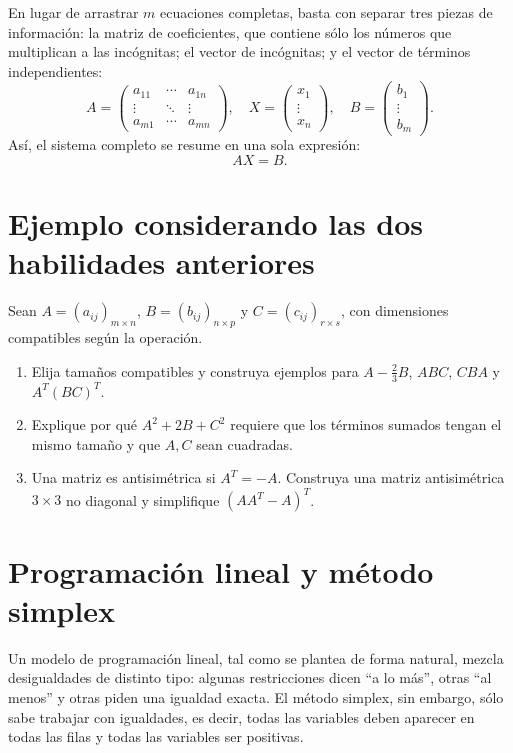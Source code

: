 \documentclass[12pt,a4paper]{article}
\begin{document}
En lugar de arrastrar \(m\) ecuaciones completas, basta con separar tres piezas de información: la matriz de coeficientes, que contiene sólo los números que multiplican a las incógnitas; el vector de incógnitas; y el vector de términos independientes:
\[
A=\begin{pmatrix}
a_{11}&\cdots&a_{1n}\\
\vdots&\ddots&\vdots\\
a_{m1}&\cdots&a_{mn}
\end{pmatrix},
\quad
X=\begin{pmatrix}x_1\\ \vdots\\x_n\end{pmatrix},
\quad
B=\begin{pmatrix}b_1\\ \vdots\\b_m\end{pmatrix}.
\]
Así, el sistema completo se resume en una sola expresión:
\[
AX=B.
\]

\section{Ejemplo considerando las dos habilidades anteriores}

Sean \(A=(a_{ij})_{m\times n}\), \(B=(b_{ij})_{n\times p}\) y \(C=(c_{ij})_{r\times s}\), con dimensiones compatibles según la operación.

\begin{enumerate}
    \item Elija tamaños compatibles y construya ejemplos para \(A-\frac{2}{3}B\), \(ABC\), \(CBA\) y \(A^T(BC)^T\).
    \item Explique por qué \(A^2+2B+C^2\) requiere que los términos sumados tengan el mismo tamaño y que \(A,C\) sean cuadradas.
    \item Una matriz es antisimétrica si \(A^T=-A\). Construya una matriz antisimétrica \(3\times3\) no diagonal y simplifique \((AA^T-A)^T\).
\end{enumerate}

\section{Programación lineal y método simplex}

Un modelo de programación lineal, tal como se plantea de forma natural, mezcla desigualdades de distinto tipo: algunas restricciones dicen ``a lo más'', otras ``al menos'' y otras piden una igualdad exacta. El método simplex, sin embargo, sólo sabe trabajar con igualdades, es decir, todas las variables deben aparecer en todas las filas y todas las variables ser positivas.
\end{document}
